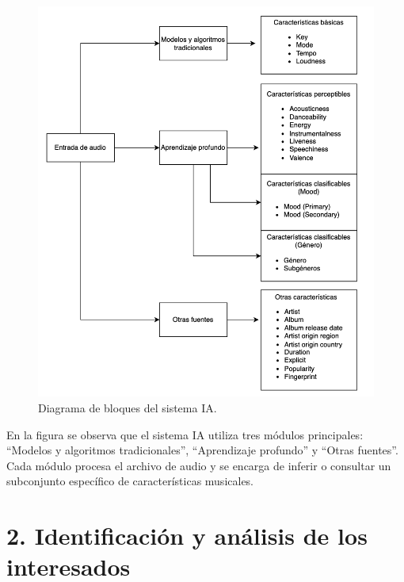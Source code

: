 \documentclass[
11pt, %
]{charter}
\begin{document}
\begin{figure}[htpb]
\centering 
\includegraphics[width=.65\textwidth]{./Figuras/diagBloques2.png}
\caption{Diagrama de bloques del sistema IA.}
\label{fig:diagBloques}
\end{figure}

\vspace{25px}
En la figura se observa que el sistema IA utiliza tres módulos principales: ``Modelos y algoritmos tradicionales'', ``Aprendizaje profundo'' y ``Otras fuentes''. Cada módulo procesa el archivo de audio y se encarga de inferir o consultar un subconjunto específico de características musicales.




\section{2. Identificación y análisis de los interesados}
\label{sec:interesados}
\end{document}
